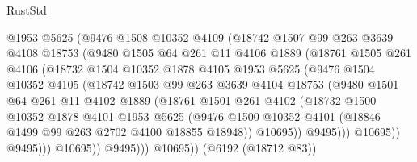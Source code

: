 \begin{lexlean}{RustStd}
\begin{coremodule}
                  @1953
                  @5625
                  (@9476
                    @1508
                    @10352
                    @4109
                    (@18742
                      @1507
                      @99
                      @263
                      @3639
                      @4108
                      @18753
                      (@9480
                        @1505
                        @64
                        @261
                        @11
                        @4106
                        @1889
                        (@18761
                          @1505
                          @261
                          @4106
                          (@18732
                            @1504
                            @10352
                            @1878
                            @4105
                            @1953
                            @5625
                            (@9476
                              @1504
                              @10352
                              @4105
                              (@18742
                                @1503
                                @99
                                @263
                                @3639
                                @4104
                                @18753
                                (@9480
                                  @1501
                                  @64
                                  @261
                                  @11
                                  @4102
                                  @1889
                                  (@18761
                                    @1501
                                    @261
                                    @4102
                                    (@18732
                                      @1500
                                      @10352
                                      @1878
                                      @4101
                                      @1953
                                      @5625
                                      (@9476
                                        @1500
                                        @10352
                                        @4101
                                        (@18846 @1499 @99 @263 @2702 @4100 @18855 @18948))
                                      @10695))
                                  @9495)))
                            @10695))
                        @9495)))
                  @10695))
              @9495)))
        @10695))
    (@6192 (@18712 @83))

\end{coremodule}
\end{lexlean}
